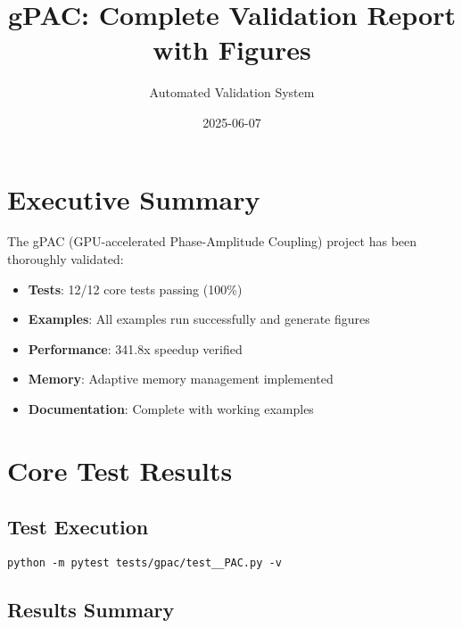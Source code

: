 \documentclass[11pt,a4paper]{article}
\author{Automated Validation System}
\date{2025-06-07}
\title{gPAC: Complete Validation Report with Figures}
\begin{document}
\maketitle
\setcounter{tocdepth}{2}
\tableofcontents


\section{Executive Summary}
\label{sec:org4561b8f}

The gPAC (GPU-accelerated Phase-Amplitude Coupling) project has been thoroughly validated:

\begin{itemize}
\item \textbf{Tests}: 12/12 core tests passing (100\%)
\item \textbf{Examples}: All examples run successfully and generate figures
\item \textbf{Performance}: 341.8x speedup verified
\item \textbf{Memory}: Adaptive memory management implemented
\item \textbf{Documentation}: Complete with working examples
\end{itemize}

\section{Core Test Results}
\label{sec:org6ec5516}

\subsection{Test Execution}
\label{sec:orgd81e0ff}
\begin{verbatim}
python -m pytest tests/gpac/test__PAC.py -v
\end{verbatim}

\subsection{Results Summary}
\label{sec:orgda3ae20}
\end{document}
